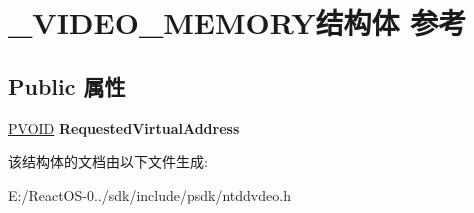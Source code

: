\hypertarget{struct___v_i_d_e_o___m_e_m_o_r_y}{}\section{\+\_\+\+V\+I\+D\+E\+O\+\_\+\+M\+E\+M\+O\+R\+Y结构体 参考}
\label{struct___v_i_d_e_o___m_e_m_o_r_y}
\subsection*{Public 属性}
\begin{DoxyCompactItemize}
\item 
\mbox{\label{struct___v_i_d_e_o___m_e_m_o_r_y_a5f8804c73b60ebceace0f531e9c12c95}} 
\hyperlink{interfacevoid}{P\+V\+O\+ID} {\bfseries Requested\+Virtual\+Address}
\end{DoxyCompactItemize}


该结构体的文档由以下文件生成\+:\begin{DoxyCompactItemize}
\item 
E\+:/\+React\+O\+S-\/0../sdk/include/psdk/ntddvdeo.\+h\end{DoxyCompactItemize}
